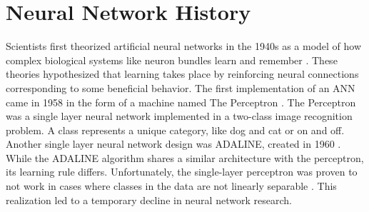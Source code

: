 











\section{Neural Network History}


Scientists first theorized artificial neural networks in the 1940s as a model of how complex biological systems like neuron bundles learn and remember \cite{Pitts1943, Hebb1949}. These theories hypothesized that learning takes place by reinforcing neural connections corresponding to some beneficial behavior. The first implementation of an ANN came in 1958 in the form of a machine named The Perceptron \cite{Rosenblatt1958, Rosenblatt1962}. The Perceptron was a single layer neural network implemented in a two-class image recognition problem. A class represents a unique category, like dog and cat or on and off. Another single layer neural network design was ADALINE, created in 1960 \cite{Widrow1960}. While the ADALINE algorithm shares a similar architecture with the perceptron, its learning rule differs. Unfortunately, the single-layer perceptron was proven to not work in cases where classes in the data are not linearly separable \cite{Minsky1969}. This realization led to a temporary decline in neural network research.

